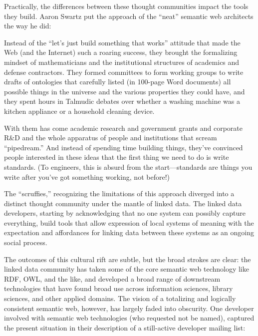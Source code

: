 \documentclass[11pt]{article}
\begin{document}
\begin{multicols}{2}
Practically, the differences between these thought communities impact
the tools they build. Aaron Swartz put the approach of the ``neat''
semantic web architects the way he did:

\begin{leftbar}
Instead of the ``let's just build something that works'' attitude that
made the Web (and the Internet) such a roaring success, they brought the
formalizing mindset of mathematicians and the institutional structures
of academics and defense contractors. They formed committees to form
working groups to write drafts of ontologies that carefully listed (in
100-page Word documents) all possible things in the universe and the
various properties they could have, and they spent hours in Talmudic
debates over whether a washing machine was a kitchen appliance or a
household cleaning device.

With them has come academic research and government grants and corporate
R\&D and the whole apparatus of people and institutions that scream
``pipedream.'' And instead of spending time building things, they've
convinced people interested in these ideas that the first thing we need
to do is write standards. (To engineers, this is absurd from the
start---standards are things you write after you've got something
working, not before!) \cite{swartzAaronSwartzProgrammable2013} 
\end{leftbar}

The ``scruffies,'' recognizing the limitations of this approach diverged
into a distinct thought community under the mantle of linked data. The
linked data developers, starting by acknowledging that no one system can
possibly capture everything, build tools that allow expression of local
systems of meaning with the expectation and affordances for linking data
between these systems as an ongoing social process.

The outcomes of this cultural rift are subtle, but the broad strokes are
clear: the linked data community has taken some of the core semantic web
technology like RDF, OWL, and the like, and developed a broad range of
downstream technologies that have found broad use across information
sciences, library sciences, and other applied domains. The vision of a
totalizing and logically consistent semantic web, however, has largely
faded into obscurity. One developer involved with semantic web
technologies (who requested not be named), captured the present
situation in their description of a still-active developer mailing list:


\end{multicols}
\end{document}
